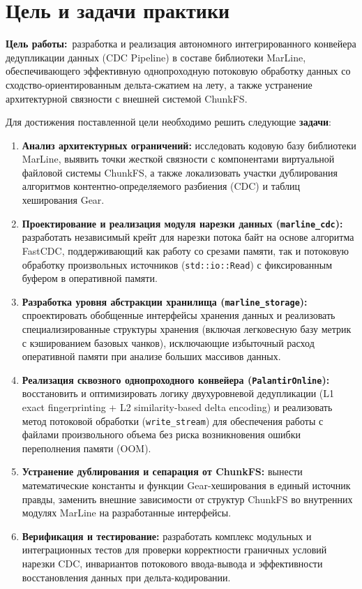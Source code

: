 \section*{Цель и задачи практики}

\textbf{Цель работы:}~разработка и реализация автономного интегрированного конвейера дедупликации данных (CDC Pipeline) в составе библиотеки MarLine, обеспечивающего эффективную однопроходную потоковую
обработку данных со сходство-ориентированным дельта-сжатием на лету, а также устранение архитектурной связности с внешней системой ChunkFS.

Для достижения поставленной цели необходимо решить следующие \textbf{задачи}:

\begin{enumerate}
    \item \textbf{Анализ архитектурных ограничений:} исследовать кодовую базу библиотеки MarLine, выявить точки жесткой связности с компонентами виртуальной файловой системы ChunkFS, а также локализовать
участки дублирования алгоритмов контентно-определяемого разбиения (CDC) и таблиц хеширования Gear.
    
    \item \textbf{Проектирование и реализация модуля нарезки данных (\texttt{marline\_cdc}):} разработать независимый крейт для нарезки потока байт на основе алгоритма FastCDC, поддерживающий как работу со
срезами памяти, так и потоковую обработку произвольных источников (\texttt{std::io::Read}) с фиксированным буфером в оперативной памяти.
    
    \item \textbf{Разработка уровня абстракции хранилища (\texttt{marline\_storage}):} спроектировать обобщенные интерфейсы хранения данных и реализовать специализированные структуры хранения (включая
легковесную базу метрик с кэшированием базовых чанков), исключающие избыточный расход оперативной памяти при анализе больших массивов данных.
    
    \item \textbf{Реализация сквозного однопроходного конвейера (\texttt{PalantirOnline}):} восстановить и оптимизировать логику двухуровневой дедупликации (L1 exact fingerprinting + L2 similarity-based
delta encoding) и реализовать метод потоковой обработки (\texttt{write\_stream}) для обеспечения работы с файлами произвольного объема без риска возникновения ошибки переполнения памяти (OOM).
    
    \item \textbf{Устранение дублирования и сепарация от ChunkFS:} вынести математические константы и функции Gear-хеширования в единый источник правды, заменить внешние зависимости от структур ChunkFS во
внутренних модулях MarLine на разработанные интерфейсы.
    
    \item \textbf{Верификация и тестирование:} разработать комплекс модульных и интеграционных тестов для проверки корректности граничных условий нарезки CDC, инвариантов потокового ввода-вывода и
эффективности восстановления данных при дельта-кодировании.
\end{enumerate}
